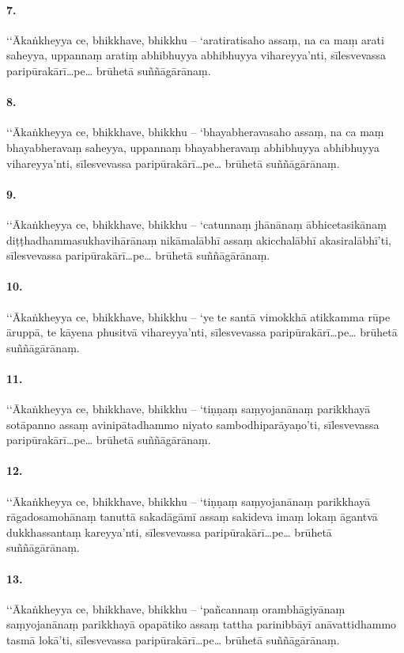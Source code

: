 \paragraph{7.} ‘‘Ākaṅkheyya ce, bhikkhave, bhikkhu – ‘aratiratisaho assaṃ, na ca maṃ arati saheyya, uppannaṃ aratiṃ abhibhuyya abhibhuyya vihareyya’nti, sīlesvevassa paripūrakārī…pe… brūhetā suññāgārānaṃ.

\paragraph{8.} ‘‘Ākaṅkheyya ce, bhikkhave, bhikkhu – ‘bhayabheravasaho assaṃ, na ca maṃ bhayabheravaṃ saheyya, uppannaṃ bhayabheravaṃ abhibhuyya abhibhuyya vihareyya’nti, sīlesvevassa paripūrakārī…pe… brūhetā suññāgārānaṃ.

\paragraph{9.} ‘‘Ākaṅkheyya ce, bhikkhave, bhikkhu – ‘catunnaṃ jhānānaṃ ābhicetasikānaṃ diṭṭhadhammasukhavihārānaṃ nikāmalābhī assaṃ akicchalābhī akasiralābhī’ti, sīlesvevassa paripūrakārī…pe… brūhetā suññāgārānaṃ.

\paragraph{10.} ‘‘Ākaṅkheyya ce, bhikkhave, bhikkhu – ‘ye te santā vimokkhā atikkamma rūpe āruppā, te kāyena phusitvā vihareyya’nti, sīlesvevassa paripūrakārī…pe… brūhetā suññāgārānaṃ.

\paragraph{11.} ‘‘Ākaṅkheyya ce, bhikkhave, bhikkhu – ‘tiṇṇaṃ saṃyojanānaṃ parikkhayā sotāpanno assaṃ avinipātadhammo niyato sambodhiparāyaṇo’ti, sīlesvevassa paripūrakārī…pe… brūhetā suññāgārānaṃ.

\paragraph{12.} ‘‘Ākaṅkheyya ce, bhikkhave, bhikkhu – ‘tiṇṇaṃ saṃyojanānaṃ parikkhayā rāgadosamohānaṃ tanuttā sakadāgāmī assaṃ sakideva imaṃ lokaṃ āgantvā dukkhassantaṃ kareyya’nti, sīlesvevassa paripūrakārī…pe… brūhetā suññāgārānaṃ.

\paragraph{13.} ‘‘Ākaṅkheyya ce, bhikkhave, bhikkhu – ‘pañcannaṃ orambhāgiyānaṃ saṃyojanānaṃ parikkhayā opapātiko assaṃ tattha parinibbāyī anāvattidhammo tasmā lokā’ti, sīlesvevassa paripūrakārī…pe… brūhetā suññāgārānaṃ.

